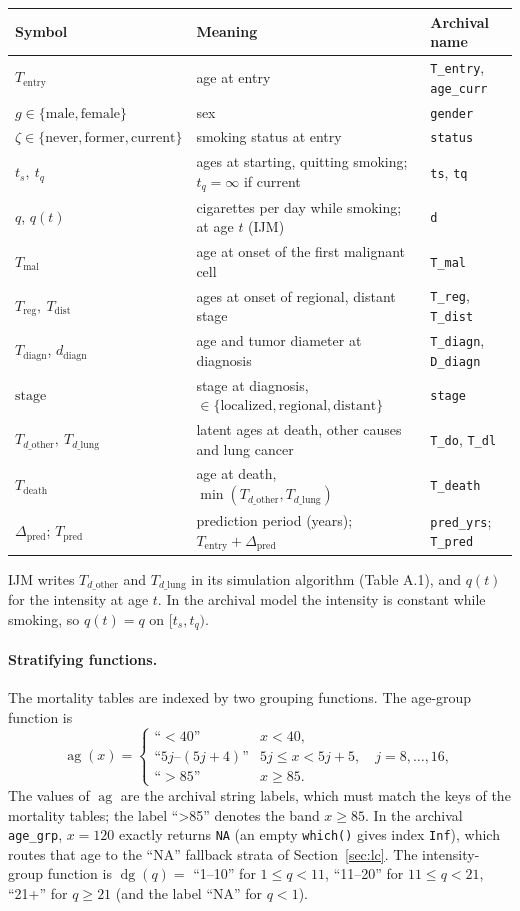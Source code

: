 \documentclass[11pt]{article}
\newcommand{\code}[1]{\texttt{#1}}
\newcommand{\ag}{\operatorname{ag}}
\newcommand{\dg}{\operatorname{dg}}
\newcommand{\sex}{g}
\newcommand{\Tentry}{T_{\mathrm{entry}}}
\newcommand{\Tmal}{T_{\mathrm{mal}}}
\newcommand{\Treg}{T_{\mathrm{reg}}}
\newcommand{\Tdist}{T_{\mathrm{dist}}}
\newcommand{\Tdiagn}{T_{\mathrm{diagn}}}
\newcommand{\Tdo}{T_{d\_\mathrm{other}}}
\newcommand{\Tdl}{T_{d\_\mathrm{lung}}}
\newcommand{\Tdeath}{T_{\mathrm{death}}}
\newcommand{\Tpred}{T_{\mathrm{pred}}}
\begin{document}
\begin{center}
\small
\begin{tabular}{@{}lll@{}}
\toprule
Symbol & Meaning & Archival name \\
\midrule
$\Tentry$ & age at entry & \code{T\_entry}, \code{age\_curr} \\
$\sex \in \{\text{male},\text{female}\}$ & sex & \code{gender} \\
$\zeta \in \{\text{never},\text{former},\text{current}\}$ & smoking status at entry & \code{status} \\
$t_s,\ t_q$ & ages at starting, quitting smoking; $t_q=\infty$ if current & \code{ts}, \code{tq} \\
$q$, $q(t)$ & cigarettes per day while smoking; at age $t$ (IJM) & \code{d} \\
$\Tmal$ & age at onset of the first malignant cell & \code{T\_mal} \\
$\Treg,\ \Tdist$ & ages at onset of regional, distant stage & \code{T\_reg}, \code{T\_dist} \\
$\Tdiagn$, $d_{\mathrm{diagn}}$ & age and tumor diameter at diagnosis & \code{T\_diagn}, \code{D\_diagn} \\
$\mathrm{stage}$ & stage at diagnosis, $\in\{\text{localized},\text{regional},\text{distant}\}$ & \code{stage} \\
$\Tdo,\ \Tdl$ & latent ages at death, other causes and lung cancer & \code{T\_do}, \code{T\_dl} \\
$\Tdeath$ & age at death, $\min(\Tdo,\Tdl)$ & \code{T\_death} \\
$\Delta_{\mathrm{pred}}$; $\Tpred$ & prediction period (years); $\Tentry+\Delta_{\mathrm{pred}}$ & \code{pred\_yrs}; \code{T\_pred} \\
\bottomrule
\end{tabular}
\end{center}
IJM writes $T_{d\_\mathrm{other}}$ and $T_{d\_\mathrm{lung}}$ in its simulation
algorithm (Table A.1), and $q(t)$ for the intensity at age $t$. In the archival
model the intensity is constant while smoking, so $q(t) = q$ on $[t_s,t_q)$.

\paragraph{Stratifying functions.} The mortality tables are indexed by two
grouping functions. The age-group function is
\[
\ag(x) =
\begin{cases}
\text{``$<40$''} & x < 40,\\
\text{``}5j\text{--}(5j+4)\text{''} & 5j \le x < 5j+5,\quad j=8,\dots,16,\\
\text{``$>85$''} & x \ge 85.
\end{cases}
\]
The values of $\ag$ are the archival string labels, which must match the keys of
the mortality tables; the label ``>85'' denotes the band $x\ge 85$. In the
archival \code{age\_grp}, $x=120$ exactly returns \code{NA} (an empty
\code{which()} gives index \code{Inf}), which routes that age to the ``NA''
fallback strata of Section~\ref{sec:lc}. The intensity-group function is
$\dg(q)=$ ``1--10'' for $1\le q<11$, ``11--20'' for $11\le q<21$, ``21+'' for
$q\ge 21$ (and the label ``NA'' for $q<1$).
\end{document}
